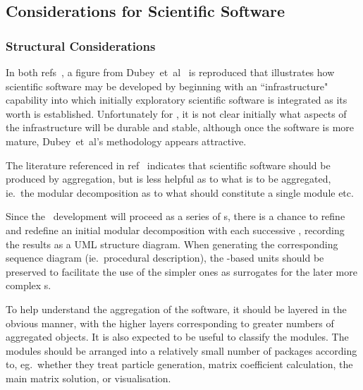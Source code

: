 \subsection{Considerations for Scientific Software}\label{sec:TS_scistruct}
\subsubsection{Structural Considerations}\label{sec:TS_structure}
In both refs~\cite{y1re331,y2re332}, a figure from Dubey~et~al~\cite{Du16Idea} is reproduced
that illustrates how scientific software may be developed by beginning with an ``infrastructure"
capability into which initially exploratory scientific software is integrated as its worth
is established. Unfortunately for \nep, it is not clear initially what  aspects  of the infrastructure
will be durable and stable, although once the software is more mature, Dubey~et~al's methodology
appears attractive.

The literature referenced in ref~\cite{y2re333}
indicates that scientific software should be produced by aggregation, but is less
helpful as to what is to be aggregated, ie.\  the modular decomposition as to what should
constitute a single module etc.

Since the \nep\ development will proceed as a series of \papp s, there is a chance
to refine and redefine an initial modular decomposition with each successive \papp,
recording the results as a UML structure diagram. When generating the corresponding
sequence diagram (ie.\  procedural description), the \papp-based units should be preserved to
facilitate the use of the simpler ones as surrogates for the later more complex \papp s.

To help understand the  aggregation of the software, it should be layered in the obvious manner,
with the higher layers corresponding to greater numbers of aggregated objects. It is also expected
to be useful to classify the modules.
The modules should be arranged into a relatively small number of packages according to, 
eg.\ whether they treat particle generation, matrix coefficient calculation, the main matrix solution, or visualisation.
